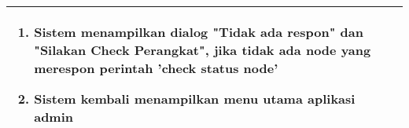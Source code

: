 \begin{table}[H]
\begin{tabular}{|p{3cm}|p{10cm}|}
\begin{enumerate}
                \item Sistem menampilkan dialog "Tidak ada respon" dan "Silakan Check Perangkat", jika tidak ada node yang merespon perintah 'check status node'
                
                \item Sistem kembali menampilkan menu utama aplikasi admin
                
            \end{enumerate}\\
            \hline
        \end{tabular}
        \label{tab:skenario4}
    \end{table}
    
